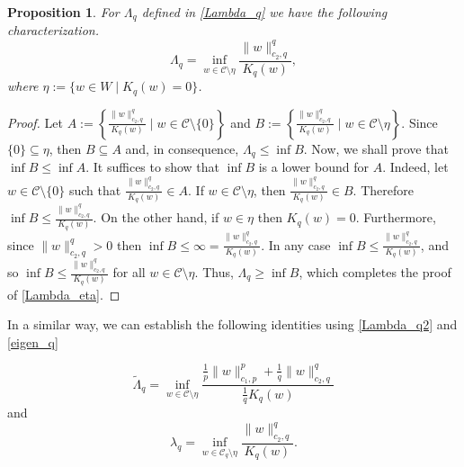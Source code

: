 \documentclass[pdflatex,sn-mathphys-num]{sn-jnl}
\theoremstyle{thmstyleone}%
\newtheorem{proposition}[theorem]{Proposition}%
\theoremstyle{thmstyletwo}%
\theoremstyle{thmstylethree}%
\theoremstyle{thmstylethree}%
\begin{document}
\begin{proposition}
    \label{RemarkH}
For $\Lambda_q$ defined in \eqref{Lambda_q} we have the following characterization. 
\begin{equation}\label{Lambda_eta}
\Lambda _q =\inf_{w \in \mathcal{C} \setminus \eta } \frac{\|w\|_{c_2,q}^q}{K_q(w)} , 
\end{equation}
where $\eta:=\{w \in W \; |\; K_q(w)=0 \}$.
\end{proposition}
\begin{proof}
Let $A:=\left\{\frac{\|w\|_{c_2, q}^q}{K_q(w)}\; |\;  w\in \mathcal{C}\setminus \{0\}\right\}$ and $B:=\left\{ \frac{\|w\|_{c_2, q}^q}{K_q(w)}\; |\;  w\in \mathcal{C}\setminus \eta\right\}$. Since $\{0\} \subseteq \eta$, then $B\subseteq A$ and, in consequence, $\Lambda_q \leqslant \inf B$. Now, we shall prove that $\inf B \leqslant \inf A$. It suffices to show that $\inf B$ is a lower bound for $A$. 
 Indeed,  let $ w\in \mathcal{C}\setminus \{0\}$ such that $\frac{\|w\|_{c_2, q}^q}{K_q(w)} \in A$. If $w\in \mathcal{C}\setminus \eta$, then $\frac{\|w\|_{c_2, q}^q}{K_q(w)} \in B$. Therefore $\inf B \leqslant \frac{\|w\|_{c_2, q}^q}{K_q(w)}$. On the other hand, if $w\in \eta$ then $K_q(w)=0$. Furthermore, since $\|w\|_{c_2,q}^q>0$ then $\inf B\leqslant \infty=\frac{\|w\|_{c_2, q}^q}{K_q(w)}$. In any case  $\inf B \leqslant \frac{\|w\|_{c_2, q}^q}{K_q(w)}$, and so  $\inf B\leqslant \frac{\|w\|_{c_2, q}^q}{K_q(w)}$ for all $w\in \mathcal{C}\setminus \eta$. Thus, $\Lambda_q \ge \inf B$,  which completes the proof of \eqref{Lambda_eta}.
\end{proof}
 
    In a similar way,  we can establish the  following identities  using \eqref{Lambda_q2} and \eqref{eigen_q}

\begin{equation}\label{til_Lambda_eta}
\tilde \Lambda _q =\inf_{w \in \mathcal{C} \setminus \eta } \frac{\frac{1}{p}\|w\|_{c_1,p}^p+\frac{1}{q}\|w\|_{c_2,q}^q}{\frac{1}{q}K_q(w)} 
\end{equation}
and 
\begin{equation}\label{lambda_eta}
\lambda _q =\inf_{w \in \mathcal{C}_q \setminus \eta } \frac{\|w\|_{c_2,q}^q}{K_q(w)} . 
\end{equation}
\end{document}
